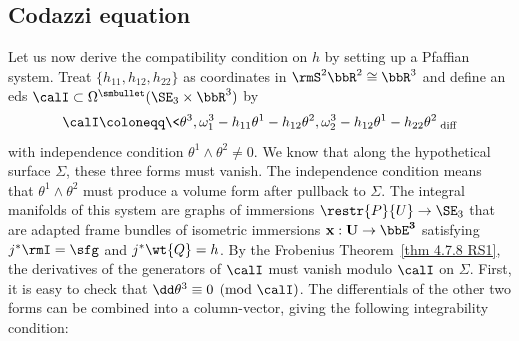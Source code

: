 \subsection{Codazzi equation}

Let us now derive the compatibility condition on $h$ by setting up a Pfaffian system. Treat $\{h_{11},h_{12},h_{22}\}$ as coordinates in $\rmS^2 \bbR^2\cong\bbR^3$ and define an \gls{eds} $\calI\subset \Omega^{\smbullet }(\SE_3\times \bbR^3)$ by
\[\calI\coloneqq \<\theta^3,\omega_1^3-h_{11}\theta^1-h_{12}\theta^2,\omega_2^3-h_{12}\theta^1-h_{22}\theta^2\>_{\mathrm{diff}}\]
with independence condition $\theta^1\wedge\theta^2\neq 0$.
We know that along the hypothetical surface $\Sigma$, these three forms must vanish. The independence condition means that $\theta^1\wedge\theta^2$ must produce a volume form after pullback to $\Sigma$. The integral manifolds of this system are graphs of immersions $\restr{P}{U}\to \SE_3$ that are adapted frame bundles of isometric immersions $\bf{x}:U\to \bbE^3$ satisfying $j^\ast \rmI=\sfg$ and $j^\ast \wt{Q}=h$. By the Frobenius Theorem~\ref{thm 4.7.8 RS1}, the derivatives of the generators of $\calI$ must vanish modulo $\calI$ on $\Sigma$. First, it is easy to check that $\dd\theta^3\equiv 0 \pmod{\calI}$. The differentials of the other two forms can be combined into a column-vector, giving the following integrability condition:
